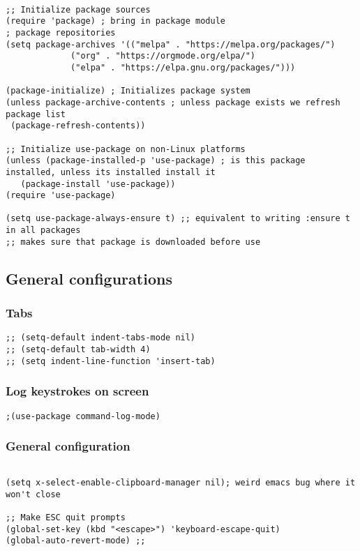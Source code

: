 \documentclass[11pt]{article}
\begin{document}
\begin{verbatim}

;; Initialize package sources
(require 'package) ; bring in package module
; package repositories
(setq package-archives '(("melpa" . "https://melpa.org/packages/")
			 ("org" . "https://orgmode.org/elpa/")
			 ("elpa" . "https://elpa.gnu.org/packages/")))

(package-initialize) ; Initializes package system
(unless package-archive-contents ; unless package exists we refresh package list
 (package-refresh-contents)) 

;; Initialize use-package on non-Linux platforms
(unless (package-installed-p 'use-package) ; is this package installed, unless its installed install it
   (package-install 'use-package))
(require 'use-package)

(setq use-package-always-ensure t) ;; equivalent to writing :ensure t in all packages
;; makes sure that package is downloaded before use
\end{verbatim}

\subsection{General configurations}
\label{sec:orgf8c44c3}
\subsubsection{Tabs}
\label{sec:org320be3e}
\begin{verbatim}
;; (setq-default indent-tabs-mode nil)
;; (setq-default tab-width 4)
;; (setq indent-line-function 'insert-tab)
\end{verbatim}

\subsubsection{Log keystrokes on screen}
\label{sec:org3e8e5be}
\begin{verbatim}
;(use-package command-log-mode)
\end{verbatim}

\subsubsection{General configuration}
\label{sec:org72d0c0c}
\begin{verbatim}

(setq x-select-enable-clipboard-manager nil); weird emacs bug where it won't close

;; Make ESC quit prompts
(global-set-key (kbd "<escape>") 'keyboard-escape-quit)
(global-auto-revert-mode) ;;

\end{verbatim}
\end{document}
